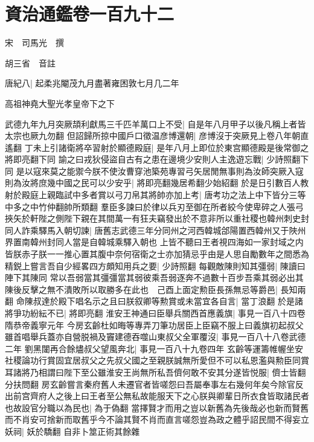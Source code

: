\chapter{資治通鑑卷一百九十二}
宋　司馬光　撰

胡三省　音註

唐紀八|{
	起柔兆閹茂九月盡著雍困敦七月几二年}


高祖神堯大聖光孝皇帝下之下

武德九年九月突厥頡利獻馬三千匹羊萬口上不受|{
	自是年八月甲子以後凡稱上者皆太宗也厥九勿翻}
但詔歸所掠中國戶口徵温彦博還朝|{
	彦博沒于突厥見上卷八年朝直遙翻}
丁未上引諸衛將卒習射於顯德殿庭|{
	是年八月上即位於東宫顯德殿是後常御之將即亮翻下同}
諭之曰戎狄侵盜自古有之患在邊境少安則人主逸遊忘戰|{
	少詩照翻下同}
是以寇來莫之能禦今朕不使汝曹穿池築苑專習弓矢居閒無事則為汝師突厥入寇則為汝將庶幾中國之民可以少安乎|{
	將即亮翻幾居希翻少始紹翻}
於是日引數百人教射於殿庭上親臨試中多者賞以弓刀帛其將帥亦加上考|{
	唐考功之法上中下皆分三等中多之中竹仲翻帥所類翻}
羣臣多諫曰於律以兵刃至御在所者絞今使卑碎之人張弓挾矢於軒陛之側陛下親在其間萬一有狂夫竊發出於不意非所以重社稷也韓州刺史封同人詐乘驛馬入朝切諫|{
	唐舊志武德三年分同州之河西韓城郃陽置西韓州又于陜州界置南韓州封同人當是自韓城乘驛入朝也}
上皆不聽曰王者視四海如一家封域之内皆朕赤子朕一一推心置其腹中奈何宿衛之士亦加猜忌乎由是人思自勵數年之間悉為精鋭上嘗言吾自少經畧四方頗知用兵之要|{
	少詩照翻}
每觀敵陳則知其彊弱|{
	陳讀曰陣下其陳同}
常以吾弱當其彊彊當其弱彼乘吾弱逐奔不過數十百步吾乘其弱必出其陳後反擊之無不潰敗所以取勝多在此也　己酉上面定勲臣長孫無忌等爵邑|{
	長知兩翻}
命陳叔達於殿下唱名示之且曰朕叙卿等勲賞或未當宜各自言|{
	當丁浪翻}
於是諸將爭功紛紜不已|{
	將即亮翻}
淮安王神通曰臣舉兵關西首應義旗|{
	事見一百八十四卷隋恭帝義寧元年}
今房玄齡杜如晦等專弄刀筆功居臣上臣竊不服上曰義旗初起叔父雖首唱舉兵蓋亦自營脱禍及竇建德吞噬山東叔父全軍覆沒|{
	事見一百八十八卷武德二年}
劉黑闥再合餘燼叔父望風奔北|{
	事見一百八十九卷四年}
玄齡等運籌帷幄坐安社稷論功行賞固宜居叔父之先叔父國之至親朕誠無所愛但不可以私恩濫與勲臣同賞耳諸將乃相謂曰陛下至公雖淮安王尚無所私吾儕何敢不安其分遂皆悦服|{
	儕士皆翻分扶問翻}
房玄齡嘗言秦府舊人未遷官者皆嗟怨曰吾屬奉事左右幾何年矣今除官反出前宫齊府人之後上曰王者至公無私故能服天下之心朕與卿輩日所衣食皆取諸民者也故設官分職以為民也|{
	為于偽翻}
當擇賢才而用之豈以新舊為先後哉必也新而賢舊而不肖安可捨新而取舊乎今不論其賢不肖而直言嗟怨豈為政之體乎詔民間不得妄立妖祠|{
	妖於驕翻}
自非卜筮正術其餘雜

